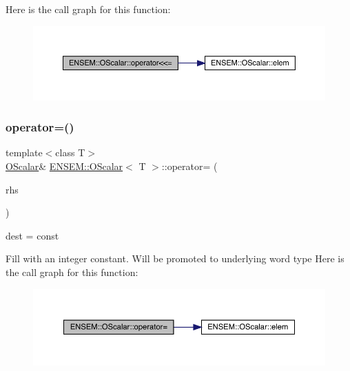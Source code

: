 Here is the call graph for this function\+:
\nopagebreak
\begin{figure}[H]
\begin{center}
\leavevmode
\includegraphics[width=350pt]{da/d80/classENSEM_1_1OScalar_a93607b92c63ae779d9d3ed131df3f449_cgraph}
\end{center}
\end{figure}
\mbox{\label{classENSEM_1_1OScalar_a88bbb49d2879dba60c29d7792a8af8dc}} 
\subsubsection{\texorpdfstring{operator=()}{operator=()}\hspace{0.1cm}{\footnotesize\ttfamily [1/8]}}
{\footnotesize\ttfamily template$<$class T$>$ \\
\mbox{\hyperlink{classENSEM_1_1OScalar}{O\+Scalar}}\& \mbox{\hyperlink{classENSEM_1_1OScalar}{E\+N\+S\+E\+M\+::\+O\+Scalar}}$<$ T $>$\+::operator= (\begin{DoxyParamCaption}\item[{const typename \mbox{\hyperlink{structENSEM_1_1WordType}{Word\+Type}}$<$ T $>$\+::Type\+\_\+t \&}]{rhs }\end{DoxyParamCaption})\hspace{0.3cm}{\ttfamily [inline]}}



dest = const 

Fill with an integer constant. Will be promoted to underlying word type Here is the call graph for this function\+:
\nopagebreak
\begin{figure}[H]
\begin{center}
\leavevmode
\includegraphics[width=350pt]{da/d80/classENSEM_1_1OScalar_a88bbb49d2879dba60c29d7792a8af8dc_cgraph}
\end{center}
\end{figure}
\mbox{\label{classENSEM_1_1OScalar_a88bbb49d2879dba60c29d7792a8af8dc}} 
